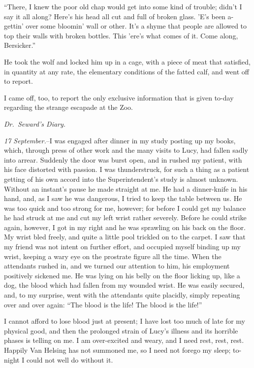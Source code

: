 \documentclass[12pt,openright]{book}
\begin{document}
“There, I knew the poor old chap would get into some kind of trouble; didn’t I say it all along? Here’s his head all cut and full of broken glass. ’E’s been a-gettin’ over some bloomin’ wall or other. It’s a shyme that people are allowed to top their walls with broken bottles. This ’ere’s what comes of it. Come along, Bersicker.”

He took the wolf and locked him up in a cage, with a piece of meat that satisfied, in quantity at any rate, the elementary conditions of the fatted calf, and went off to report.

I came off, too, to report the only exclusive information that is given to-day regarding the strange escapade at the Zoo.

\textit{Dr. Seward’s Diary.}

\textit{17 September.}–I was engaged after dinner in my study posting up my books, which, through press of other work and the many visits to Lucy, had fallen sadly into arrear. Suddenly the door was burst open, and in rushed my patient, with his face distorted with passion. I was thunderstruck, for such a thing as a patient getting of his own accord into the Superintendent’s study is almost unknown. Without an instant’s pause he made straight at me. He had a dinner-knife in his hand, and, as I saw he was dangerous, I tried to keep the table between us. He was too quick and too strong for me, however; for before I could get my balance he had struck at me and cut my left wrist rather severely. Before he could strike again, however, I got in my right and he was sprawling on his back on the floor. My wrist bled freely, and quite a little pool trickled on to the carpet. I saw that my friend was not intent on further effort, and occupied myself binding up my wrist, keeping a wary eye on the prostrate figure all the time. When the attendants rushed in, and we turned our attention to him, his employment positively sickened me. He was lying on his belly on the floor licking up, like a dog, the blood which had fallen from my wounded wrist. He was easily secured, and, to my surprise, went with the attendants quite placidly, simply repeating over and over again: “The blood is the life! The blood is the life!”

I cannot afford to lose blood just at present; I have lost too much of late for my physical good, and then the prolonged strain of Lucy’s illness and its horrible phases is telling on me. I am over-excited and weary, and I need rest, rest, rest. Happily Van Helsing has not summoned me, so I need not forego my sleep; to-night I could not well do without it.
\end{document}
